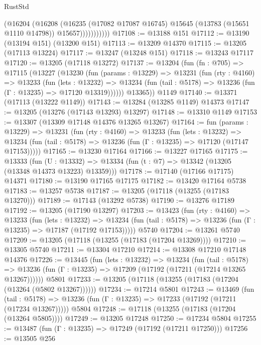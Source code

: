 \begin{lexlean}{RustStd}
\begin{coremodule}
                    (@16204
                      (@16208
                        (@16235
                          (@17082 @17087 @16745)
                          @15645
                          (@13783 (@15651 @1110 @14798))
                          @15657)))))))))))
@17108 := @13188 @151
@17112 := @13190 (@13194 @151) (@13200 @151)
@17113 := @13209 @14370
@17115 := @13205 (@17113 @13224)
@17117 := @13247 (@13248 @151)
@17118 := @13243 @17117
@17120 := @13205 (@17118 @13272)
@17137 := @13204
    (fun (fn : @705) =>
    @17115
      (@13227
        (@13230
          (fun (params : @13229) =>
          @13231
            (fun (rty : @4160) =>
            @13233
              (fun (lets : @13232) =>
              @13234 (fun (tail : @5178) => @13236 (fun (Γ : @13235) => @17120 @13319))))))
        @13365))
    @1149
@17140 := @13371 (@17113 (@13222 @1149))
@17143 := @13284 (@13285 @1149) @14373
@17147 := @13205 (@13276 (@17143 @13293) @13297)
@17148 := @13310 @1149
@17153 := @13307 (@13309 @17148 @14376 @13265 @13267)
@17164 := fun (params : @13229) =>
  @13231
    (fun (rty : @4160) =>
    @13233
      (fun (lets : @13232) =>
      @13234 (fun (tail : @5178) => @13236 (fun (Γ : @13235) => @17120 (@17147 @17153)))))
@17165 := @13230 @17164
@17166 := @13227 @17165
@17175 := @13333
    (fun (U : @13332) => @13334 (fun (t : @7) => @13342 (@13205 (@13348 @14373 @13223) @13359)))
@17178 := @17140 (@17166 @17175) @14371
@17180 := @13190 @17165 @17175
@17182 := @13420 @17164 @5738
@17183 := @13257 @5738
@17187 := @13205 (@17118 (@13255 (@17183 @13270)))
@17189 := @17143 (@13292 @5738)
@17190 := @13276 @17189
@17192 := @13205 (@17190 @13297)
@17203 := @13423
    (fun (rty : @4160) =>
    @13233
      (fun (lets : @13232) =>
      @13234 (fun (tail : @5178) => @13236 (fun (Γ : @13235) => @17187 (@17192 @17153)))))
    @5740
@17204 := @13261 @5740
@17209 := @13205 (@17118 (@13255 (@17183 (@17204 @13269))))
@17210 := @13305 @5740
@17211 := @13304 @17210
@17214 := @13308 @17210 @17148 @14376
@17226 := @13445
    (fun (lets : @13232) =>
    @13234
      (fun (tail : @5178) =>
      @13236 (fun (Γ : @13235) => @17209 (@17192 (@17211 (@17214 @13265 @13267))))))
    @5801
@17233 := @13205 (@17118 (@13255 (@17183 (@17204 (@13264 (@5802 @13267))))))
@17234 := @17214 @5801
@17243 := @13469
    (fun (tail : @5178) => @13236 (fun (Γ : @13235) => @17233 (@17192 (@17211 (@17234 @13267)))))
    @5804
@17248 := @17118 (@13255 (@17183 (@17204 (@13264 @5805))))
@17249 := @13205 @17248
@17250 := @17234 @5804
@17255 := @13487 (fun (Γ : @13235) => @17249 (@17192 (@17211 @17250)))
@17256 := @13505 @256

\end{coremodule}
\end{lexlean}
